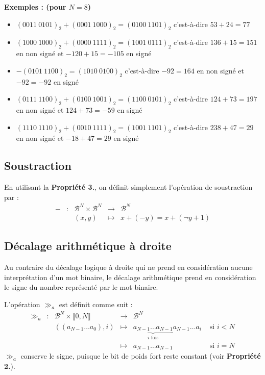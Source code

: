 \documentclass[../../main.tex]{subfiles}
\begin{document}
\textbf{Exemples : (pour $N = 8$)}
\begin{itemize}
  \item $(0011\ 0101)_{2} + (0001\ 1000)_{2} = (0100\ 1101)_{2}$\newline
    c'est-à-dire $53 + 24 = 77$
  \item $(1000\ 1000)_{2} + (0000\ 1111)_{2} = (1001\ 0111)_{2}$\newline
    c'est-à-dire $136 + 15 = 151$ en non signé et $-120 + 15 = -105$ en signé
  \item $-(0101\ 1100)_{2} = (1010\ 0100)_{2}$\newline
    c'est-à-dire $-92 = 164$ en non signé et $-92 = -92$ en signé
  \item $(0111\ 1100)_{2} + (0100\ 1001)_{2} = (1100\ 0101)_{2}$\newline
    c'est-à-dire $124 + 73 = 197$ en non signé et $124 + 73 = -59$ en signé
  \item $(1110\ 1110)_{2} + (0010\ 1111)_{2} = (1001\ 1101)_{2}$\newline
    c'est-à-dire $238 + 47 = 29$ en non signé et $-18 + 47 = 29$ en signé
\end{itemize}
\subsection{Soustraction}
En utilisant la \textbf{Propriété 3.}, on définit simplement l'opération de soustraction par :
$$
\begin{array}{lclcl}
- & : & \mathcal{B}^{N}\times{\mathcal{B}^{N}} & \rightarrow & \mathcal{B}^{N} \\
     &   & (x, y) & \mapsto & x + (-y) = x + (\neg{y} + 1)
\end{array}
$$
\subsection{Décalage arithmétique à droite}
Au contraire du décalage logique à droite qui ne prend en considération aucune interprétation d'un mot binaire, le décalage arithmétique prend en considération le signe du nombre représenté par le mot binaire.

L'opération $\gg_{a}$ est définit comme suit :
$$
\begin{array}{lclcll}
\gg_{a} & : & \mathcal{B}^{N}\times{\llbracket0, N\rrbracket} & \rightarrow & \mathcal{B}^{N} \\
     &   & ((a_{N-1}\dots a_{0}), i) & \mapsto & \underbrace{a_{N-1}\dots a_{N-1}}_{\text{$i$ fois}}a_{N-1}\dots a_{i} & \text{ si $i < N$} \\
     &   & & \mapsto & a_{N-1}\dots a_{N-1} & \text{ si $i = N$}
\end{array}
$$
$\gg_{a}$ conserve le signe, puisque le bit de poids fort reste constant (voir \textbf{Propriété 2.}).
\end{document}
